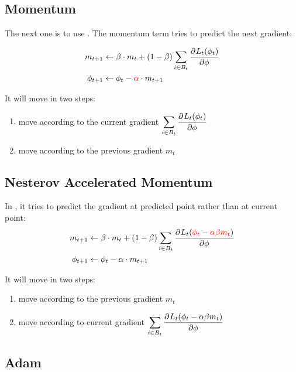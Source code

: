 \subsection{Momentum}

The next one is to use . The momentum term tries to predict the next gradient:

\begin{equation}
    \begin{aligned}
        m_{t+1} &\leftarrow \beta \cdot m_t + (1-\beta) \sum_{i \in B_t} \dpd{L_t(\phi_t)}{\phi} \\
        \phi_{t+1} &\leftarrow \phi_t - {\color{red}\alpha} \cdot m_{t+1}
    \end{aligned}
\end{equation}

It will move in two steps:
\begin{enumerate}
    \item move according to the current gradient $\displaystyle \sum_{i \in B_t} \dpd{L_t(\phi_t)}{\phi}$
    \item move according to the previous gradient $m_t$
\end{enumerate}


\subsection{Nesterov Accelerated Momentum}

In , it tries to predict the gradient at predicted point rather than at current point:
\begin{equation}
    \begin{aligned}
        m_{t+1} &\leftarrow \beta \cdot m_t + (1-\beta)\sum_{i \in B_t} \dpd{L_t({\color{red} \phi_t - \alpha \beta m_t})}{\phi} \\
        \phi_{t+1} &\leftarrow \phi_t - \alpha \cdot m_{t+1}
    \end{aligned}
\end{equation}

It will move in two steps:
\begin{enumerate}
    \item move according to the previous gradient $m_t$
    \item move according to current gradient $\displaystyle \sum_{i \in B_t} \dpd{L_t(\phi_t - \alpha \beta m_t)}{\phi}$
\end{enumerate}


\subsection{Adam}

